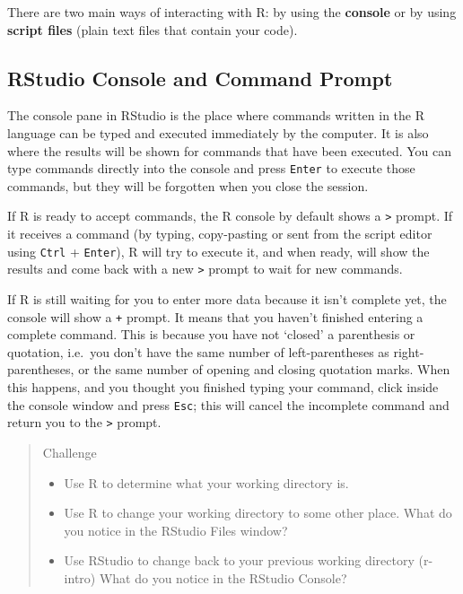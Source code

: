 \documentclass[]{book}
\providecommand{\tightlist}{%
  \setlength{\itemsep}{0pt}\setlength{\parskip}{0pt}}
\begin{document}
There are two main ways of interacting with R: by using the
\textbf{console} or by using \textbf{script files} (plain text files
that contain your code).

\subsection{RStudio Console and Command
Prompt}\label{rstudio-console-and-command-prompt}

The console pane in RStudio is the place where commands written in the R
language can be typed and executed immediately by the computer. It is
also where the results will be shown for commands that have been
executed. You can type commands directly into the console and press
\texttt{Enter} to execute those commands, but they will be forgotten
when you close the session.

If R is ready to accept commands, the R console by default shows a
\texttt{\textgreater{}} prompt. If it receives a command (by typing,
copy-pasting or sent from the script editor using \texttt{Ctrl} +
\texttt{Enter}), R will try to execute it, and when ready, will show the
results and come back with a new \texttt{\textgreater{}} prompt to wait
for new commands.

If R is still waiting for you to enter more data because it isn't
complete yet, the console will show a \texttt{+} prompt. It means that
you haven't finished entering a complete command. This is because you
have not `closed' a parenthesis or quotation, i.e.~you don't have the
same number of left-parentheses as right-parentheses, or the same number
of opening and closing quotation marks. When this happens, and you
thought you finished typing your command, click inside the console
window and press \texttt{Esc}; this will cancel the incomplete command
and return you to the \texttt{\textgreater{}} prompt.

\begin{quote}
Challenge

\begin{itemize}
\tightlist
\item
  Use R to determine what your working directory is.
\item
  Use R to change your working directory to some other place. What do
  you notice in the RStudio Files window?
\item
  Use RStudio to change back to your previous working directory
  (r-intro) What do you notice in the RStudio Console?
\end{itemize}
\end{quote}
\end{document}
